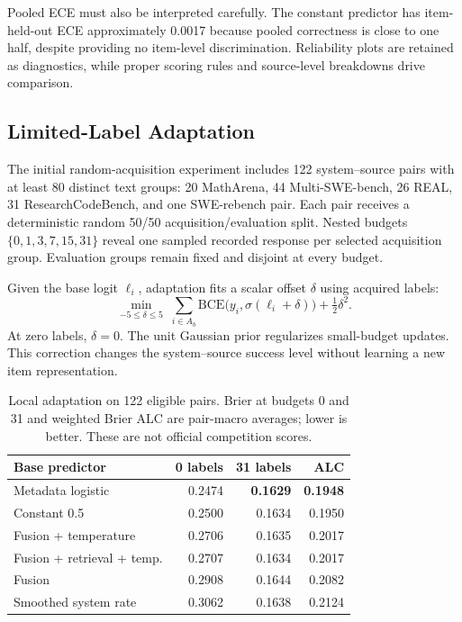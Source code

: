 \documentclass[conference]{IEEEtran}
\begin{document}
Pooled ECE must also be interpreted carefully. The constant predictor has item-held-out ECE approximately 0.0017 because pooled correctness is close to one half, despite providing no item-level discrimination. Reliability plots are retained as diagnostics, while proper scoring rules and source-level breakdowns drive comparison.

\subsection{Limited-Label Adaptation}
The initial random-acquisition experiment includes 122 system--source pairs with at least 80 distinct text groups: 20 MathArena, 44 Multi-SWE-bench, 26 REAL, 31 ResearchCodeBench, and one SWE-rebench pair. Each pair receives a deterministic random 50/50 acquisition/evaluation split. Nested budgets $\{0,1,3,7,15,31\}$ reveal one sampled recorded response per selected acquisition group. Evaluation groups remain fixed and disjoint at every budget.

Given the base logit $\ell_i$, adaptation fits a scalar offset $\delta$ using acquired labels:
\begin{equation}
\min_{-5\leq\delta\leq5}\;\sum_{i\in A_b}\mathrm{BCE}\big(y_i,\sigma(\ell_i+\delta)\big)+\tfrac12\delta^2.
\end{equation}
At zero labels, $\delta=0$. The unit Gaussian prior regularizes small-budget updates. This correction changes the system--source success level without learning a new item representation.

\begin{table}[t]
\caption{Local adaptation on 122 eligible pairs. Brier at budgets 0 and 31 and weighted Brier ALC are pair-macro averages; lower is better. These are not official competition scores.}
\label{tab:adapt}\centering\small
\begin{tabular}{@{}lrrr@{}}
\toprule
Base predictor & 0 labels & 31 labels & ALC \\
\midrule
Metadata logistic & 0.2474 & \textbf{0.1629} & \textbf{0.1948} \\
Constant 0.5 & 0.2500 & 0.1634 & 0.1950 \\
Fusion + temperature & 0.2706 & 0.1635 & 0.2017 \\
Fusion + retrieval + temp. & 0.2707 & 0.1634 & 0.2017 \\
Fusion & 0.2908 & 0.1644 & 0.2082 \\
Smoothed system rate & 0.3062 & 0.1638 & 0.2124 \\
\bottomrule
\end{tabular}
\end{table}
\end{document}
